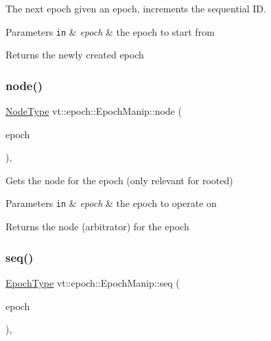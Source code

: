 The next epoch given an epoch, increments the sequential ID. 


\begin{DoxyParams}[1]{Parameters}
\mbox{\tt in}  & {\em epoch} & the epoch to start from\\
\hline
\end{DoxyParams}
\begin{DoxyReturn}{Returns}
the newly created epoch 
\end{DoxyReturn}
\mbox{\label{structvt_1_1epoch_1_1_epoch_manip_a7120f73ef583ab8f061334fc0bc519c3}} 
\subsubsection{\texorpdfstring{node()}{node()}}
{\footnotesize\ttfamily \hyperlink{namespacevt_a866da9d0efc19c0a1ce79e9e492f47e2}{Node\+Type} vt\+::epoch\+::\+Epoch\+Manip\+::node (\begin{DoxyParamCaption}\item[{\hyperlink{namespacevt_a985a5adf291c34a3ca263b3378388236}{Epoch\+Type} const \&}]{epoch }\end{DoxyParamCaption})\hspace{0.3cm}{\ttfamily [inline]}, {\ttfamily [static]}}



Gets the node for the epoch (only relevant for rooted) 


\begin{DoxyParams}[1]{Parameters}
\mbox{\tt in}  & {\em epoch} & the epoch to operate on\\
\hline
\end{DoxyParams}
\begin{DoxyReturn}{Returns}
the node (arbitrator) for the {\ttfamily epoch} 
\end{DoxyReturn}
\mbox{\label{structvt_1_1epoch_1_1_epoch_manip_ac34685702f19dde2f5bc25fcb43ec038}} 
\subsubsection{\texorpdfstring{seq()}{seq()}}
{\footnotesize\ttfamily \hyperlink{namespacevt_a985a5adf291c34a3ca263b3378388236}{Epoch\+Type} vt\+::epoch\+::\+Epoch\+Manip\+::seq (\begin{DoxyParamCaption}\item[{\hyperlink{namespacevt_a985a5adf291c34a3ca263b3378388236}{Epoch\+Type} const \&}]{epoch }\end{DoxyParamCaption})\hspace{0.3cm}{\ttfamily [inline]}, {\ttfamily [static]}}




